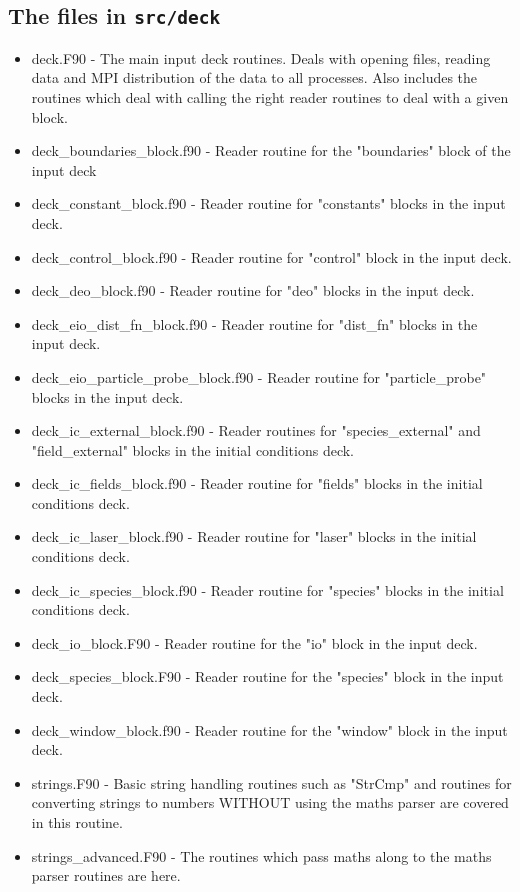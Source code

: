 \documentclass[12pt]{article}
\newcommand{\inlinecode}[1]{{\color{warwickred} \bf\texttt{#1}}}
\begin{document}
\subsection{The files in \inlinecode{src/deck}}
\begin{itemize}
\item deck.F90 - The main input deck routines. Deals with opening files,
  reading data and MPI distribution of the data to all processes. Also
  includes the routines which deal with calling the right reader routines to
  deal with a given block.
\item deck\_boundaries\_block.f90 - Reader routine for the "boundaries" block
  of the input deck
\item deck\_constant\_block.f90 - Reader routine for "constants" blocks in the
  input deck.
\item deck\_control\_block.f90 - Reader routine for "control" block in the
  input deck.
\item deck\_deo\_block.f90 - Reader routine for "deo" blocks in the input
  deck.
\item deck\_eio\_dist\_fn\_block.f90 - Reader routine for "dist\_fn" blocks in
  the input deck.
\item deck\_eio\_particle\_probe\_block.f90 - Reader routine for
  "particle\_probe" blocks in the input deck.
\item deck\_ic\_external\_block.f90 - Reader routines for "species\_external"
  and "field\_external" blocks in the initial conditions deck.
\item deck\_ic\_fields\_block.f90 - Reader routine for "fields" blocks in the
  initial conditions deck.
\item deck\_ic\_laser\_block.f90 - Reader routine for "laser" blocks in the
  initial conditions deck.
\item deck\_ic\_species\_block.f90 - Reader routine for "species" blocks in
  the initial conditions deck.
\item deck\_io\_block.F90 - Reader routine for the "io" block in the input
  deck.
\item deck\_species\_block.F90 - Reader routine for the "species" block in the
  input deck.
\item deck\_window\_block.f90 - Reader routine for the "window" block in the
  input deck.
\item strings.F90 - Basic string handling routines such as "StrCmp" and
  routines for converting strings to numbers WITHOUT using the maths parser
  are covered in this routine.
\item strings\_advanced.F90 - The routines which pass maths along to the maths
  parser routines are here.
\end{itemize}
\end{document}
